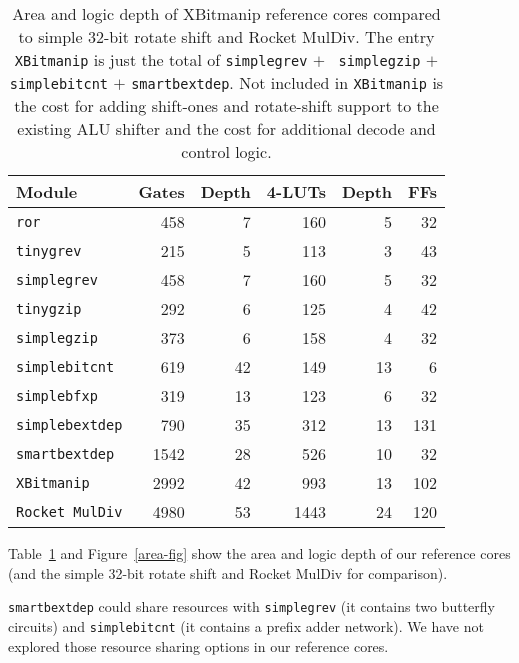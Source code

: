 \begin{table}[h]
\begin{center}
\begin{tabular}{l|rr|rr|r}
Module & Gates & Depth & 4-LUTs & Depth & FFs \\
\hline
{\tt ror} & 458 & 7 & 160 & 5 & 32 \\
\hline
{\tt tinygrev} & 215 & 5 & 113 & 3 & 43 \\
{\tt simplegrev} & 458 & 7 & 160 & 5 & 32 \\
\hline
{\tt tinygzip} & 292 & 6 & 125 & 4 & 42 \\
{\tt simplegzip} & 373 & 6 & 158 & 4 & 32 \\
\hline
{\tt simplebitcnt} & 619 & 42 & 149 & 13 & 6 \\
\hline
{\tt simplebfxp} & 319 & 13 & 123 & 6 & 32 \\
\hline
{\tt simplebextdep} & 790 & 35 & 312 & 13 & 131 \\
{\tt smartbextdep} & 1542 & 28 & 526 & 10 & 32 \\
\hline
{\tt XBitmanip} & 2992 & 42 & 993 & 13 & 102 \\
{\tt Rocket MulDiv} & 4980 & 53 & 1443 & 24 & 120 \\
\end{tabular}
\end{center}
\caption{Area and logic depth of XBitmanip reference cores compared to simple 32-bit rotate
shift and Rocket MulDiv. The entry {\tt XBitmanip} is just the total of {\tt simplegrev} $+$ {\tt
simplegzip} $+$ {\tt simplebitcnt} $+$ {\tt smartbextdep}. Not included in {\tt XBitmanip} is the
cost for adding shift-ones and rotate-shift support to the existing ALU shifter
and the cost for additional decode and control logic.}
\label{area-tab}
\end{table}

Table~\ref{area-tab} and Figure~\ref{area-fig} show the area and logic depth of
our reference cores (and the simple 32-bit rotate shift and Rocket MulDiv for
comparison).

{\tt smartbextdep} could share resources with {\tt simplegrev} (it contains
two butterfly circuits) and {\tt simplebitcnt} (it contains a prefix adder network).
We have not explored those resource sharing options in our reference cores.
